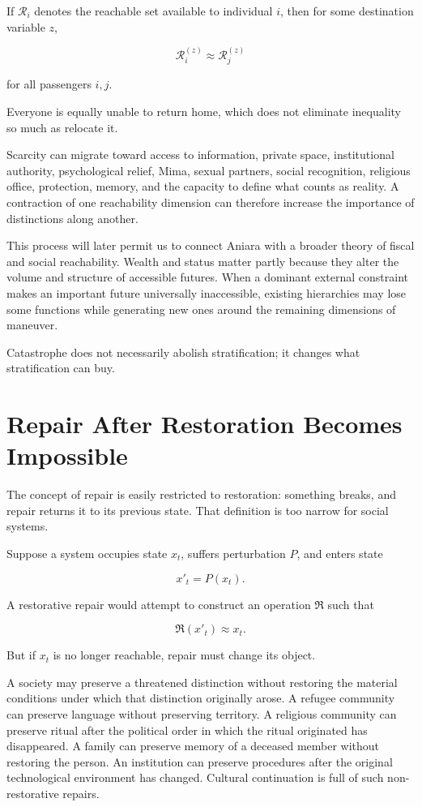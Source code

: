 \documentclass[11pt,oneside]{book}
\theoremstyle{definition}
\theoremstyle{remark}
\newcommand{\R}{\mathcal{R}}
\newcommand{\Repair}{\mathfrak{R}}
\begin{document}
If \(\R_i\) denotes the reachable set available to individual \(i\), then for some destination variable \(z\),

\[
\R_i^{(z)}
\approx
\R_j^{(z)}
\]

for all passengers \(i,j\).

Everyone is equally unable to return home, which does not eliminate inequality so much as relocate it.

Scarcity can migrate toward access to information, private space, institutional authority, psychological relief, Mima, sexual partners, social recognition, religious office, protection, memory, and the capacity to define what counts as reality. A contraction of one reachability dimension can therefore increase the importance of distinctions along another.

This process will later permit us to connect Aniara with a broader theory of fiscal and social reachability. Wealth and status matter partly because they alter the volume and structure of accessible futures. When a dominant external constraint makes an important future universally inaccessible, existing hierarchies may lose some functions while generating new ones around the remaining dimensions of maneuver.

Catastrophe does not necessarily abolish stratification; it changes what stratification can buy.

\section{Repair After Restoration Becomes Impossible}

The concept of repair is easily restricted to restoration: something breaks, and repair returns it to its previous state. That definition is too narrow for social systems.

Suppose a system occupies state \(x_t\), suffers perturbation \(P\), and enters state

\[
x'_t=P(x_t).
\]

A restorative repair would attempt to construct an operation \(\Repair\) such that

\[
\Repair(x'_t)\approx x_t.
\]

But if \(x_t\) is no longer reachable, repair must change its object.

A society may preserve a threatened distinction without restoring the material conditions under which that distinction originally arose. A refugee community can preserve language without preserving territory. A religious community can preserve ritual after the political order in which the ritual originated has disappeared. A family can preserve memory of a deceased member without restoring the person. An institution can preserve procedures after the original technological environment has changed. Cultural continuation is full of such non-restorative repairs.
\end{document}
